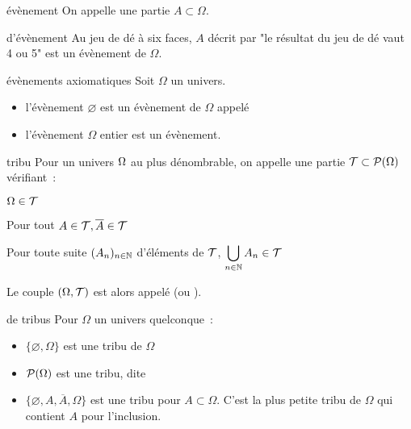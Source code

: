 \begin{definition}{}{évènement}
    On appelle  une partie $A \subset \Omega$.
\end{definition}

\begin{exemple}{}{d'évènement}
    Au jeu de dé à six faces, $A$ décrit par "le résultat du jeu de dé vaut 4 ou 5" est un évènement de $\Omega$.
\end{exemple}

\begin{proposition}{}{évènements axiomatiques}
    Soit $\Omega$ un univers.
    \begin{itemize}
        \item l'évènement $\varnothing$ est un évènement de $\Omega$ appelé 
        \item l'évènement $\Omega$ entier est un évènement.
    \end{itemize}
\end{proposition}

\begin{definition}{}{tribu}
    Pour un univers $\Omega$ au plus dénombrable, on appelle  une partie $\mathcal{T} \subset \mathcal{P}(\Omega)$ vérifiant~:
    \begin{enumeratebf}
        \item $\Omega \in \mathcal{T}$
        \item Pour tout $A \in \mathcal{T}, \overline{A} \in \mathcal{T}$
        \item Pour toute suite $(A_n)_{n \in \mathbb{N}}$ d'éléments de $\mathcal{T}$, $\displaystyle \bigcup_{n \in \mathbb{N}}A_n \in \mathcal{T}$
    \end{enumeratebf}
    Le couple $(\Omega, \mathcal{T})$ est alors appelé  (ou ).
\end{definition}

\begin{exemple}{}{de tribus}
    Pour $\Omega$ un univers quelconque~:
    \begin{itemize}
        \item $\{\varnothing, \Omega\}$ est une tribu de $\Omega$
        \item $\mathcal{P}(\Omega)$ est une tribu, dite 
        \item $\{\varnothing, A, \overline{A}, \Omega\}$ est une tribu pour $A \subset \Omega$. C'est la plus petite tribu de $\Omega$ qui contient $A$ pour l'inclusion.
    \end{itemize}
\end{exemple}


